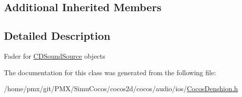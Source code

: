 \subsection*{Additional Inherited Members}


\subsection{Detailed Description}
Fader for \hyperlink{interfaceCDSoundSource}{C\+D\+Sound\+Source} objects 

The documentation for this class was generated from the following file\+:\begin{DoxyCompactItemize}
\item 
/home/pmx/git/\+P\+M\+X/\+Simu\+Cocos/cocos2d/cocos/audio/ios/\hyperlink{cocos2d_2cocos_2audio_2ios_2CocosDenshion_8h}{Cocos\+Denshion.\+h}\end{DoxyCompactItemize}
